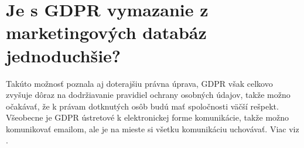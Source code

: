 \section{Je s GDPR vymazanie z marketingových databáz jednoduchšie?}
Takúto možnosť poznala aj doterajšiu právna úprava, GDPR však celkovo zvyšuje dôraz na dodržiavanie pravidiel ochrany osobných údajov, takže možno očakávať, že k právam dotknutých osôb budú mať spoločnosti väčší rešpekt. Všeobecne je GDPR ústretové k elektronickej forme komunikácie, takže možno komunikovať emailom, ale je na mieste si všetku komunikáciu uchovávať. Viac viz \cite{mobily}.

 
